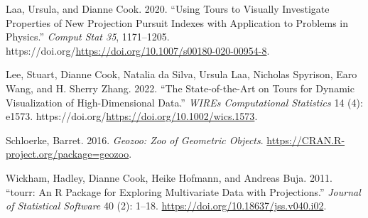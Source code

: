 \begin{CSLReferences}{1}{0}
\leavevmode{}%
Laa, Ursula, and Dianne Cook. 2020. {``Using Tours to Visually Investigate Properties of New Projection Pursuit Indexes with Application to Problems in Physics.''} \emph{Comput Stat 35}, 1171--1205. https://doi.org/\url{https://doi.org/10.1007/s00180-020-00954-8}.

\leavevmode{}%
Lee, Stuart, Dianne Cook, Natalia da Silva, Ursula Laa, Nicholas Spyrison, Earo Wang, and H. Sherry Zhang. 2022. {``The State-of-the-Art on Tours for Dynamic Visualization of High-Dimensional Data.''} \emph{WIREs Computational Statistics} 14 (4): e1573. https://doi.org/\url{https://doi.org/10.1002/wics.1573}.

\leavevmode{}%
Schloerke, Barret. 2016. \emph{Geozoo: Zoo of Geometric Objects}. \url{https://CRAN.R-project.org/package=geozoo}.

\leavevmode{}%
Wickham, Hadley, Dianne Cook, Heike Hofmann, and Andreas Buja. 2011. {``{tourr}: An {R} Package for Exploring Multivariate Data with Projections.''} \emph{Journal of Statistical Software} 40 (2): 1--18. \url{https://doi.org/10.18637/jss.v040.i02}.

\end{CSLReferences}



\address{%
Zoljargal Batsaikhan\\
Monash University\\%
Department of Econometrics and Business Statistics\\ Clayton, VIC, Australia\\
%
\url{https://github.com/zolabat}\\%
\textit{ORCiD: \href{https://orcid.org/0009-0005-0055-1448}{0009-0005-0055-1448}}\\%
\href{mailto:zoljargal11@gmail.com}{\nolinkurl{zoljargal11@gmail.com}}%
}

\address{%
Dianne Cook\\
Monash University\\%
Department of Econometrics and Business Statistics\\ Clayton, VIC, Australia\\
%
\url{http://www.dicook.org}\\%
\textit{ORCiD: \href{https://orcid.org/0000-0002-3813-7155}{0000-0002-3813-7155}}\\%
\href{mailto:dicook@monash.edu}{\nolinkurl{dicook@monash.edu}}%
}

\address{%
Ursula Laa\\
BOKU University\\%
Institute of Statistics\\ Vienna, Austria\\
%
\url{https://uschilaa.github.io}\\%
\textit{ORCiD: \href{https://orcid.org/0000-0002-0249-6439}{0000-0002-0249-6439}}\\%
\href{mailto:ursula.laa@boku.ac.at}{\nolinkurl{ursula.laa@boku.ac.at}}%
}

